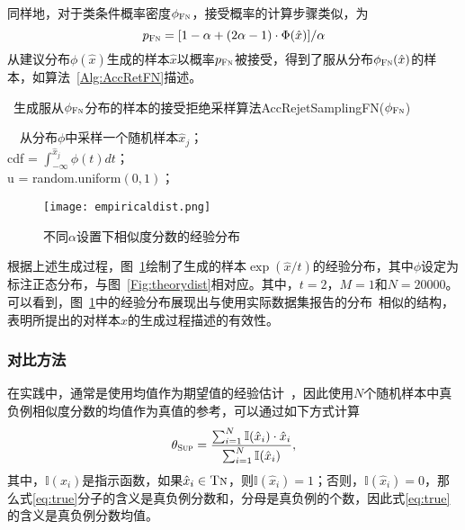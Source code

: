 同样地，对于类条件概率密度$\phi_{\textsc{Fn}}$，接受概率的计算步骤类似，为
\[p_{\textsc{Fn}} = [1 - \alpha + (2 \alpha - 1)\cdot \Phi(\hat{x})] / \alpha \]
从建议分布$\phi(\hat{x})$生成的样本$\hat{x}$以概率$p_{\textsc{Fn}}$被接受，得到了服从分布$ \phi_{\textsc{Fn}}(\hat{x})$的样本，如算法~\ref{Alg:AccRetFN}描述。
\begin{algorithm}[!]
	\SetAlgoLined
	\small
	\caption{~生成服从$\phi_{\textsc{Fn}}$分布的样本的接受拒绝采样算法AccRejetSamplingFN($\phi_{\textsc{Fn}}$)}\label{Alg:AccRetFN}
	\BlankLine
	~~从分布$\phi$中采样一个随机样本$\hat{x}_j$；\\
	cdf = $\int_{-\infty}^{\hat{x}_j} \phi(t)dt$； \\
	u = random.uniform$(0,1)$； 
	
	
\end{algorithm}
\begin{figure}[!]
	\centering
	\texttt{[image: empiricaldist.png]}
	\caption{不同$\alpha$设置下相似度分数的经验分布}
	\label{Fig:empiricaldist}
\end{figure}
\par
根据上述生成过程，图~\ref{Fig:empiricaldist}绘制了生成的样本$\exp(\hat{x}/t)$的经验分布，其中$\phi$设定为标注正态分布，与图~\ref{Fig:theorydist}相对应。其中，$t=2$，$M=1$和$N=20000$。可以看到，图~\ref{Fig:empiricaldist}中的经验分布展现出与使用实际数据集报告的分布~\cite{Robinson:2021:ICLR, Xia:2022:ICML}相似的结构，表明所提出的对样本$\hat{x}$的生成过程描述的有效性。

\subsubsection{对比方法}
在实践中，通常是使用均值作为期望值的经验估计~\cite{Oord:2018:arxiv,Chuang:2020:NIPS,Chen:2020:ICML}，因此使用$N$个随机样本中真负例相似度分数的均值作为真值的参考，可以通过如下方式计算
\begin{equation}\label{eq:true}
	\theta_{\textsc{Sup}} = \frac{\sum_{i=1}^N \mathbb{I}(\hat x_i) \cdot \hat{x}_i  }{ \sum_{i=1}^N \mathbb I(\hat{x}_i) },
\end{equation}
其中，$\mathbb{I}(x_i)$是指示函数，如果$\hat{x}_i \in \textsc{Tn}$，则$\mathbb{I}(\hat x_i)=1$；否则，$\mathbb{I}(\hat x_i)=0$，那么式\eqref{eq:true}分子的含义是真负例分数和，分母是真负例的个数，因此式\eqref{eq:true}的含义是真负例分数均值。

